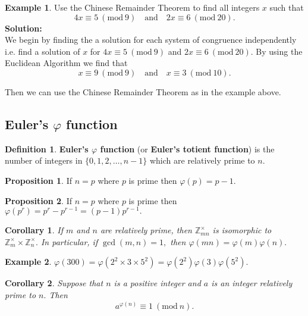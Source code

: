 \documentclass[12pt, a4paper]{article}
\newcommand{\bb}[1]{\mathbb{#1}}
\newcommand{\Mod}[1]{\ (\mathrm{mod}\ #1)}
\theoremstyle{definition}
\newtheorem{definition}{Definition}[section]
\newtheorem*{example}{Example}
\newtheorem{proposition}{Proposition}
\theoremstyle{plain}
\newtheorem{corollary}{Corollary}[theorem]
\begin{document}
\begin{example}
Use the Chinese Remainder Theorem to find all integers $x$ such that 
$$4x \equiv 5 \Mod{9} \quad \text{and} \quad 2x\equiv 6 \Mod{20}.$$
\textbf{Solution:} \\
We begin by finding the a solution for each system of congruence independently i.e. find a solution of $x$ for $4x \equiv 5 \Mod{9}$ and $2x\equiv 6 \Mod{20}.$ By using the Euclidean Algorithm we find that
$$x \equiv 9 \Mod{9} \quad \text{and} \quad x\equiv 3 \Mod{10}.$$

Then we can use the Chinese Remainder Theorem as in the example above.
\end{example}

\subsection{Euler's \texorpdfstring{$\varphi$}{TEXT} function}

\begin{definition}
\textbf{Euler's $\varphi$ function} (or \textbf{Euler's totient function}) is the number of integers in $\{0,1,2,\ldots,n-1\}$ which are relatively prime to $n.$
\end{definition}

\begin{proposition}
If $n=p$ where $p$ is prime then $\varphi(p)=p-1.$
\end{proposition}

\begin{proposition}
If $n=p$ where $p$ is prime then $\varphi(p^r)=p^r-p^{r-1}=(p-1)p^{r-1}.$
\end{proposition}

\begin{corollary}
If $m$ and $n$ are relatively prime, then $\bb{Z}^{\times}_{mn}$ is isomorphic to $\bb{Z}^{\times}_m \times \bb{Z}^{\times}_n.$ In particular, if $\gcd(m, n) = 1,$ then $\varphi(mn) = \varphi(m)\varphi(n).$
\end{corollary}

\begin{example}
$\varphi(300)=\varphi(2^2 \times 3 \times 5^2)=\varphi(2^2)\varphi(3)\varphi(5^2).$
\end{example}

\begin{corollary}
Suppose that $n$ is a positive integer and $a$ is an integer relatively prime to $n.$ Then 
$$a^{\varphi(n)} \equiv 1 \Mod{n}.$$
\end{corollary}
\end{document}
